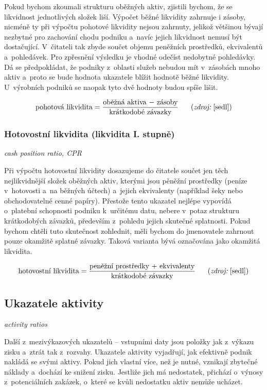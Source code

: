 Pokud bychom zkoumali strukturu oběžných aktiv, zjistili bychom, že se likvidnost jednotlivých složek liší. Výpočet běžné likvidity zahrnuje i zásoby, nicméně ty při výpočtu pohotové likvidity nejsou zahrnuty, jelikož většinou bývají nezbytné pro zachování chodu podniku a~navíc jejich likvidnost nemusí být dostačující.
V~čitateli tak zbyde součet objemu peněžních prostředků, ekvivalentů a~pohledávek. Pro zpřesnění výsledku je vhodné odečíst nedobytné pohledávky.
Dá se předpokládat, že podniky z~oblasti služeb nebudou mít v~zásobách mnoho aktiv a~proto se bude hodnota ukazatele blížit hodnotě běžné likvidity. U~výrobních podniků se naopak tyto dvě hodnoty budou spíše lišit.

$$\vz{pohotová likvidita}{oběžná aktiva $-$ zásoby}{krátkodobé závazky} \scite{sedl}$$

\subsubsection{Hotovostní likvidita (likvidita I. stupně)}
\textit{cash position ratio, CPR}

Při výpočtu hotovostní likvidity dosazujeme do čitatele součet jen těch nejlikvidnější složek oběžných aktiv, kterými jsou pěněžní prostředky (peníze v~hotovosti a~na běžných účtech) a~jejich ekvivalenty (například šeky nebo obchodovatelné cenné papíry).
Přestože tento ukazatel nejlépe vypovídá o~platební schopnosti podniku k~určitému datu, nebere v~potaz strukturu krátkodobých závazků, především z~pohledu jejich skutečné splatnosti.\cite{mendelu} Pokud bychom chtěli tuto skutečnost zohlednit, měli bychom do jmenovatele zahrnout pouze okamžitě splatné závazky. Taková varianta bývá označována jako okamžitá likvidita.


$$\vz{hotovostní likvidita}{peněžní prostředky $+$ ekvivalenty}{krátkodobé závazky} \scite{sedl}$$








\subsection{Ukazatele aktivity}
\textit{activity ratios}

Další z~mezivýkazových ukazatelů -- vstupními daty jsou položky jak z~výkazu zisku a~ztrát tak z~rozvahy. Ukazatele aktivity vyjadřují, jak efektivně podnik nakládá se svými aktivy. Pokud jich vlastní více, než je nutné, vznikají zbytečné náklady a~dochází ke snižení zisku. Jestliže jich má nedostatek, přichází o~výnosy z~potenciálních zakázek, o~které se kvůli nedostatku aktiv nemůže ucházet.

